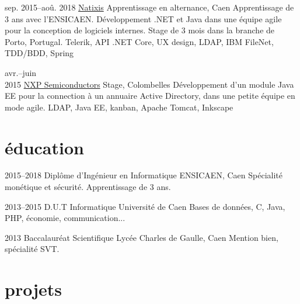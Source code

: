 \documentclass[]{friggeri-cv}
\begin{document}
\begin{entrylist}
	\entry
	{sep. 2015--aoû. 2018}
	{\href{https://www.natixis.com}{Natixis}}
	{Apprentissage en alternance, Caen}
	{Apprentissage de 3 ans avec l’ENSICAEN. Développement \csharp .NET et Java dans une équipe agile pour la conception de logiciels internes. Stage de 3 mois dans la branche de Porto, Portugal.}
	{Telerik, API .NET Core, UX design, LDAP, IBM FileNet, TDD/BDD, Spring}
	
	\entry
	{avr.--juin\\2015}
	{\href{https://www.nxp.com}{NXP Semiconductors}}
	{Stage, Colombelles}
	{Développement d’un module Java EE pour la connection à un annuaire Active Directory, dans une petite équipe en mode agile.}
	{LDAP, Java EE, kanban, Apache Tomcat, Inkscape}
\end{entrylist}

\section{éducation}

\begin{entrylist}
    \entry
    {2015--2018}
    {Diplôme d’Ingénieur {\normalfont en Informatique}}
    {ENSICAEN, Caen}
    {Spécialité monétique et sécurité. Apprentissage de 3 ans.}{}
    
    \entry
    {2013--2015}
    {D.U.T {\normalfont Informatique}}
    {Université de Caen}
    {Bases de données, C, Java, PHP, économie, communication...}{}
    
    \entry
    {2013}
    {Baccalauréat {\normalfont Scientifique}}
    {Lycée Charles de Gaulle, Caen}
    {Mention bien, spécialité SVT.}{}
\end{entrylist}

\section{projets}
\end{document}
